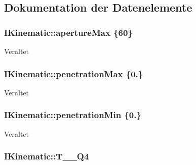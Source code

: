 \subsection{Dokumentation der Datenelemente}
\hypertarget{classIKinematic_a5b70ed8f56334c0ee5041e5eb787a056}{
\subsubsection[{aperture\-Max}]{\setlength{\rightskip}{0pt plus 5cm}I\-Kinematic\-::aperture\-Max \{60\}\hspace{0.3cm}{\ttfamily [protected]}}}\label{classIKinematic_a5b70ed8f56334c0ee5041e5eb787a056}
\begin{DoxyRefDesc}{Veraltet}
\item[\hyperlink{deprecated__deprecated000002}{Veraltet}]\end{DoxyRefDesc}
\hypertarget{classIKinematic_a628b36a0331179b979468468c1efed54}{
\subsubsection[{penetration\-Max}]{\setlength{\rightskip}{0pt plus 5cm}I\-Kinematic\-::penetration\-Max \{0.\}\hspace{0.3cm}{\ttfamily [protected]}}}\label{classIKinematic_a628b36a0331179b979468468c1efed54}
\begin{DoxyRefDesc}{Veraltet}
\item[\hyperlink{deprecated__deprecated000003}{Veraltet}]\end{DoxyRefDesc}
\hypertarget{classIKinematic_a17905911cc852a855bd985bfda640ea2}{
\subsubsection[{penetration\-Min}]{\setlength{\rightskip}{0pt plus 5cm}I\-Kinematic\-::penetration\-Min \{0.\}\hspace{0.3cm}{\ttfamily [protected]}}}\label{classIKinematic_a17905911cc852a855bd985bfda640ea2}
\begin{DoxyRefDesc}{Veraltet}
\item[\hyperlink{deprecated__deprecated000004}{Veraltet}]\end{DoxyRefDesc}
\hypertarget{classIKinematic_a0f3ae85bd946533cf8a22120f597ab00}{
\subsubsection[{T\-\_\-0\-\_\-\-Q4}]{\setlength{\rightskip}{0pt plus 5cm}I\-Kinematic\-::\-T\-\_\-\_\-\-Q4\hspace{0.3cm}{\ttfamily [protected]}}}\label{classIKinematic_a0f3ae85bd946533cf8a22120f597ab00}


